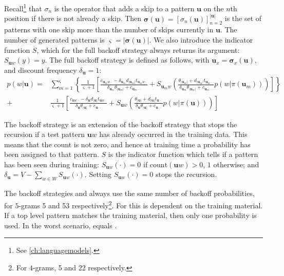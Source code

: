Recall\footnote{See \cref{ch:languagemodels}.} that $\sigma_n$ is the operator that adds a skip to a pattern $\mathbf{u}$ on the $n$th position if there is not already a skip. Then $\boldsymbol\sigma(\mathbf{u}) = \left[\sigma_n(\mathbf{u})\right]_{n=2}^{|\mathbf{u}|}$ is the set of patterns with one skip more than the number of skips currently in $\mathbf{u}$. The number of generated patterns is $\boldsymbol\varsigma=|\boldsymbol\sigma(\mathbf{u})|$.
We also introduce the indicator function $S$, which for the {\sf full} backoff strategy always returns its argument: $S_{\mathbf{u}w}(y) = y$.
%
%
The {\sf full} backoff strategy is defined as follows, with $\mathbf{u}_x = \boldsymbol\sigma_x(\mathbf{u})$, and discount frequency $\delta_{\mathbf{u}} = 1$:
 \begin{equation}
 \begin{split}
p(w|\mathbf{u}) =& \sum_{m=1}^{\boldsymbol\varsigma}\left\{ \frac{1}{\mathbf{\boldsymbol\varsigma}+1}\left[
\frac{c_{\mathbf{u}_mw\cdot}-\delta_{\mathbf{u}_m}d_{|\mathbf{u}_m|}t_{\mathbf{u}_mw\cdot}}{\delta_{\mathbf{u}_m}\theta_{|\mathbf{u}_m|}+c_{\mathbf{u}_m\cdot\cdot}} + S_{\mathbf{u}_mw}\left(
\frac{\theta_{|\mathbf{u}_m|}+d_{|\mathbf{u}_m|}t_{\mathbf{u}_m\cdot\cdot}}{\delta_{\mathbf{u}_m}\theta_{|\mathbf{u}_m|}+c_{\mathbf{u}_m\cdot\cdot}}
p(w|\pi(\mathbf{u}_m))\right)\right] \right\} \\ 
+ 
& \frac{1}{\mathbf{\boldsymbol\varsigma}+1}\left[
\frac{c_{\mathbf{u}w\cdot}-\delta_{\mathbf{u}}d_{|\mathbf{u}|}t_{\mathbf{u}w\cdot}}{\delta_{\mathbf{u}}\theta_{|\mathbf{u}|}+c_{\mathbf{u}\cdot\cdot}}+ S_{\mathbf{u}w}\left(\frac{\theta_{|\mathbf{u}|}+d_{|\mathbf{u}|}t_{\mathbf{u}\cdot\cdot}}{\delta_{\mathbf{u}}\theta_{|\mathbf{u}|}+c_{\mathbf{u}\cdot\cdot}}
p(w|\pi(\mathbf{u}))\right)\right]
  \end{split}\end{equation}
 
 The \BOL backoff strategy is an extension of the \BOF backoff strategy that stops the recursion if a test pattern $\mathbf{u}w$ has already occurred in the training data. This means that the count is not zero, and hence at training time a probability has been assigned to that pattern. $S$ is the indicator function which tells if a pattern has been seen during training: $S_{\mathbf{u}w}(\cdot) = 0$ if $\mathrm{count}(\mathbf{u}w) > 0$, $1$ otherwise; and $\delta_{\mathbf{u}} = V-\sum_{w\in W} S_{\mathbf{u}w}(\cdot)$. Setting $S_{\mathbf{u}w}(\cdot) = 0$ stops the recursion.

The backoff strategies \BON and \BOF always use the same number of backoff probabilities, for $5$-grams 5 and 53 respectively\footnote{For $4$-grams, 5 and 22 respectively.}. For \BOL this is dependent on the training material. If a top level pattern matches the training material, then only one probability is used. In the worst scenario, \BOL equals \BOF.

